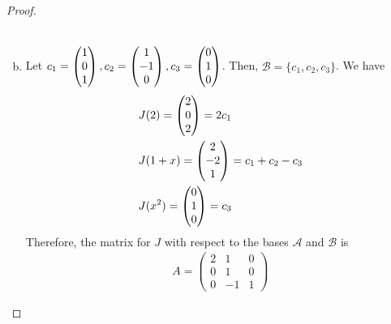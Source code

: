 \begin{proof}
\begin{enumerate}[(a)]
\[\begin{aligned}
            \end{aligned}
        \]
        \item  
        Let $c_1=\begin{pmatrix} 1\\ 0\\ 1\end{pmatrix},c_2=\begin{pmatrix} 1\\ -1\\ 0\end{pmatrix},c_3=\begin{pmatrix} 0\\ 1\\ 0\end{pmatrix}$.
        Then, $\mathcal{B}=\{c_1,c_2,c_3\}$.
        We have
        \[
            \begin{aligned}
                &J(2)=\begin{pmatrix} 2\\ 0\\ 2\end{pmatrix}=2c_1\\
                &J(1+x)=\begin{pmatrix} 2\\ -2\\ 1\end{pmatrix}=c_1+c_2-c_3\\
                &J(x^2)=\begin{pmatrix} 0\\ 1\\ 0\end{pmatrix}=c_3
            \end{aligned}
        \]
        Therefore, the matrix for $J$ with respect to the bases $\mathcal{A}$ and $\mathcal{B}$ is 
        \[
            \begin{aligned}
                A=\begin{pmatrix}
                    2 & 1 & 0 \\
                    0 & 1 & 0\\
                    0 & -1 & 1
                \end{pmatrix}
            \end{aligned}
        \]
    \end{enumerate}
    \renewcommand{\qedsymbol}{}
\end{proof}